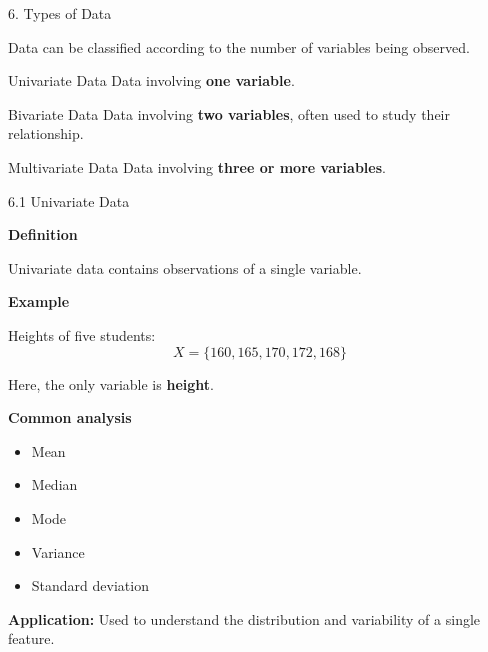 
\begin{frame}{6. Types of Data}

Data can be classified according to the number of variables
being observed.

\vspace{0.3cm}

\begin{block}{Univariate Data}
Data involving \textbf{one variable}.
\end{block}

\begin{block}{Bivariate Data}
Data involving \textbf{two variables}, often used to study their
relationship.
\end{block}

\begin{block}{Multivariate Data}
Data involving \textbf{three or more variables}.
\end{block}

\end{frame}



\begin{frame}{6.1 Univariate Data}

\textbf{Definition}

Univariate data contains observations of a single variable.

\textbf{Example}

Heights of five students:
\[
X = \{160,165,170,172,168\}
\]

Here, the only variable is \textbf{height}.

\textbf{Common analysis}

\begin{itemize}
    \item Mean
    \item Median
    \item Mode
    \item Variance
    \item Standard deviation

\end{itemize}

\textbf{Application:} Used to understand the distribution and
variability of a single feature.

\end{frame}


